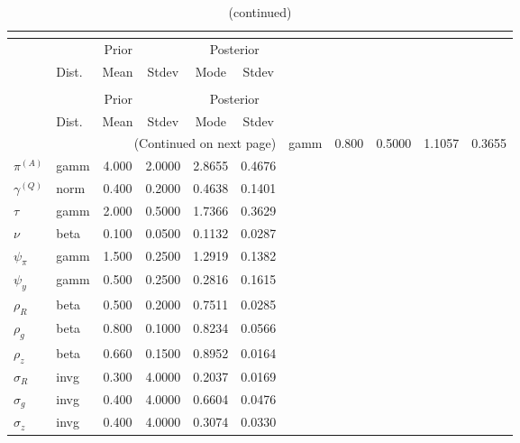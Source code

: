  
\begin{center}
\begin{longtable}{llcccc} 
\caption{Results from posterior maximization (parameters)}\\
 \label{Table:Posterior:1}\\
\toprule 
  & \multicolumn{3}{c}{Prior}  &  \multicolumn{2}{c}{Posterior} \\
  \cmidrule(r{.75em}){2-4} \cmidrule(r{.75em}){5-6}
  & Dist. & Mean  & Stdev & Mode & Stdev \\ 
\midrule \endfirsthead 
\caption{(continued)}\\
 \bottomrule 
  & \multicolumn{3}{c}{Prior}  &  \multicolumn{2}{c}{Posterior} \\
  \cmidrule(r{.75em}){2-4} \cmidrule(r{.75em}){5-6}
  & Dist. & Mean  & Stdev & Mode & Stdev \\ 
\midrule \endhead 
\bottomrule \multicolumn{6}{r}{(Continued on next page)}\endfoot 
\bottomrule\endlastfoot 
${r_{A}}$ & gamm &   0.800 & 0.5000 &   1.1057 &  0.3655 \\ 
${\pi^{(A)}}$ & gamm &   4.000 & 2.0000 &   2.8655 &  0.4676 \\ 
${\gamma^{(Q)}}$ & norm &   0.400 & 0.2000 &   0.4638 &  0.1401 \\ 
${\tau}$ & gamm &   2.000 & 0.5000 &   1.7366 &  0.3629 \\ 
${\nu}$ & beta &   0.100 & 0.0500 &   0.1132 &  0.0287 \\ 
${\psi_\pi}$ & gamm &   1.500 & 0.2500 &   1.2919 &  0.1382 \\ 
${\psi_y}$ & gamm &   0.500 & 0.2500 &   0.2816 &  0.1615 \\ 
${\rho_R}$ & beta &   0.500 & 0.2000 &   0.7511 &  0.0285 \\ 
${\rho_{g}}$ & beta &   0.800 & 0.1000 &   0.8234 &  0.0566 \\ 
${\rho_z}$ & beta &   0.660 & 0.1500 &   0.8952 &  0.0164 \\ 
${\sigma_R}$ & invg &   0.300 & 4.0000 &   0.2037 &  0.0169 \\ 
${\sigma_{g}}$ & invg &   0.400 & 4.0000 &   0.6604 &  0.0476 \\ 
${\sigma_z}$ & invg &   0.400 & 4.0000 &   0.3074 &  0.0330 \\ 
\end{longtable}
 \end{center}
